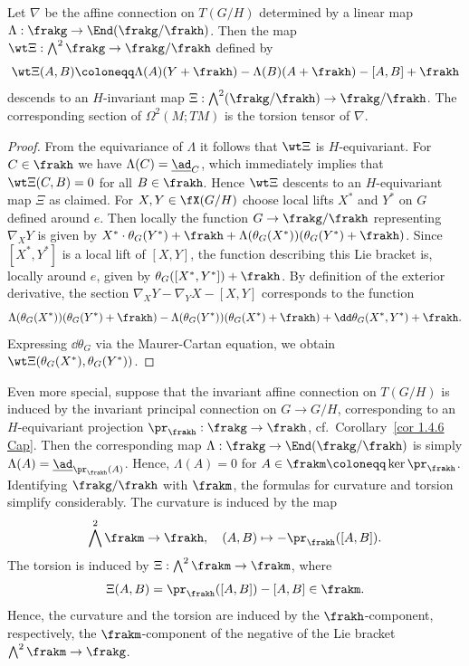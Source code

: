 \begin{prop}\label{prop 1.4.8 Cap}
    Let $\nabla$ be the affine connection on $T(G\slash H)$ determined by a linear map $\Lambda:\frakg\to\End(\frakg\slash\frakh)$. Then the map $\wt\Xi:\bigwedge^2\frakg\to \frakg\slash\frakh$ defined by 
    \[\wt\Xi(A,B)\coloneqq \Lambda(A)(Y+\frakh)-\Lambda(B)(A+\frakh)-[A,B]+\frakh\]
    descends to an $H$-invariant map $\Xi:\bigwedge^2(\frakg\slash\frakh)\to \frakg\slash\frakh$. The corresponding section of $\Omega^2(M;TM)$ is the torsion tensor of $\nabla$.
\end{prop}
\begin{proof}
    From the equivariance of $\Lambda$ it follows that $\wt\Xi$ is $H$-equivariant. For $C\in\frakh$ we have $\Lambda(C)=\underline{\ad}_C$, which immediately implies that $\wt\Xi(C,B)=0$ for all $B\in\frakh$. Hence $\wt\Xi$ descents to an $H$-equivariant map $\Xi$ as claimed. For $X,Y\in\fX(G\slash H)$ choose local lifts $X^\ast$ and $Y^\ast$ on $G$ defined around $e$. Then locally the function $G\to \frakg\slash\frakh$ representing $\nabla_X Y$ is given by $X^\ast\cdot\theta_G(Y^\ast)+\frakh+\Lambda(\theta_G(X^\ast))(\theta_G(Y^\ast)+\frakh)$. Since $[X^\ast,Y^\ast]$ is a local lift of $[X,Y]$, the function describing this Lie bracket is, locally around $e$, given by $\theta_G([X^\ast,Y^\ast])+\frakh$. By definition of the exterior derivative, the section $\nabla_X Y-\nabla_Y X-[X,Y]$ corresponds to the function 
    \[\Lambda(\theta_G(X^\ast))(\theta_G(Y^\ast)+\frakh)-\Lambda(\theta_G(Y^\ast))(\theta_G(X^\ast)+\frakh)+\dd\theta_G(X^\ast,Y^\ast)+\frakh.\]
    Expressing $\dd\theta_G$ via the Maurer-Cartan equation, we obtain $\wt\Xi(\theta_G(X^\ast),\theta_G(Y^\ast))$.
\end{proof}

Even more special, suppose that the invariant affine connection on $T(G\slash H)$ is induced by the invariant principal connection on $G\to G\slash H$, corresponding to an $H$-equivariant projection $\pr_\frakh:\frakg\to\frakh$, cf.\ Corollary~\ref{cor 1.4.6 Cap}. Then the corresponding map $\Lambda:\frakg\to \End(\frakg\slash\frakh)$ is simply $\Lambda(A)=\underline{\ad}_{\pr_\frakh(A)}$. Hence, $\Lambda(A)=0$ for $A\in \frakm\coloneqq \ker\pr_\frakh$. Identifying $\frakg\slash\frakh$ with $\frakm$, the formulas for curvature and torsion simplify considerably. The curvature is induced by the map 
\[\bigwedge^2\frakm\to \frakh,\quad (A,B)\mapsto -\pr_\frakh([A,B]).\]
The torsion is induced by $\Xi:\bigwedge^2\frakm\to \frakm$, where 
\[\Xi(A,B)=\pr_\frakh([A,B])-[A,B]\in\frakm.\]
Hence, the curvature and the torsion are induced by the $\frakh$-component, respectively, the $\frakm$-component of the negative of the Lie bracket $\bigwedge^2\frakm\to \frakg$.

